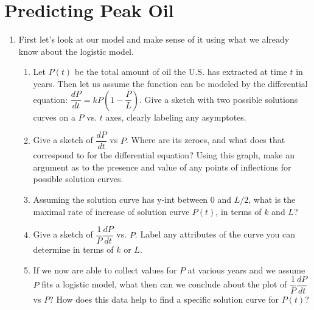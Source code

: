 \documentclass{amsbook}
\begin{document}
    \section*{Predicting Peak Oil}
    \begin{enumerate}
	
	\item First let's look at our model and make sense of it using what we already know about the logistic model.
		\begin{enumerate}
			\item Let $P(t)$ be the total amount of oil the U.S. has extracted at time $t$ in years. Then let us assume the function can be modeled by the differential equation: $\dfrac{dP}{dt}=kP\left(1-\dfrac{P}{L}\right)$. Give a sketch with two possible solutions curves on a $P$ vs. $t$ axes, clearly labeling any asymptotes.
			\item Give a sketch of $\dfrac{dP}{dt}$ vs $P$. Where are its zeroes, and what does that correspond to for the differential equation? Using this graph, make an argument as to the presence and value of any points of inflections for possible solution curves.
			\item Assuming the solution curve has y-int between 0 and $L/2$, what is the maximal rate of increase of solution curve $P(t)$, in terms of $k$ and $L$?
			\item Give a sketch of $\dfrac{1}{P}\dfrac{dP}{dt}$ vs. $P$. Label any attributes of the curve you can determine in terms of $k$ or $L$.
			\item If we now are able to collect values for $P$ at various years and we assume $P$ fits a logistic model, what then can we conclude about the plot of $\dfrac{1}{P}\dfrac{dP}{dt}$ vs $P$? How does this data help to find a specific solution curve for $P(t)$?
\end{enumerate}
\newpage


\end{enumerate}
\end{document}
